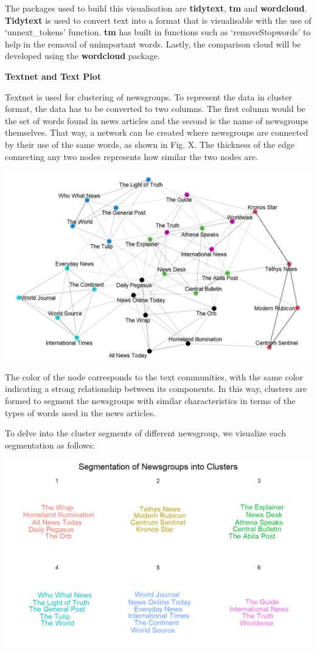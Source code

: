 \documentclass{acm_proc_article-sp}
\begin{document}
The packages used to build this visualisation are \textbf{tidytext},
\textbf{tm} and \textbf{wordcloud}. \textbf{Tidytext} is used to convert
text into a format that is visualisable with the use of `unnext\_tokens'
function. \textbf{tm} has built in functions such as `removeStopwords'
to help in the removal of unimportant words. Lastly, the comparison
cloud will be developed using the \textbf{wordcloud} package.

\textbf{Textnet and Text Plot}

Textnet is used for clustering of newsgroups. To represent the data in
cluster format, the data has to be converted to two columns. The first
column would be the set of words found in news articles and the second
is the name of newsgroups themselves. That way, a network can be created
where newsgroups are connected by their use of the same words, as shown
in Fig. X. The thickness of the edge connecting any two nodes represents
how similar the two nodes are.

\includegraphics{img/image02.png}

The color of the node corresponds to the text communities, with the same
color indicating a strong relationship between its components. In this
way, clusters are formed to segment the newsgroups with similar
characteristics in terms of the types of words used in the news
articles.

To delve into the cluster segments of different newsgroup, we visualize
each segmentation as follows:

\includegraphics{img/image04.png}
\end{document}
